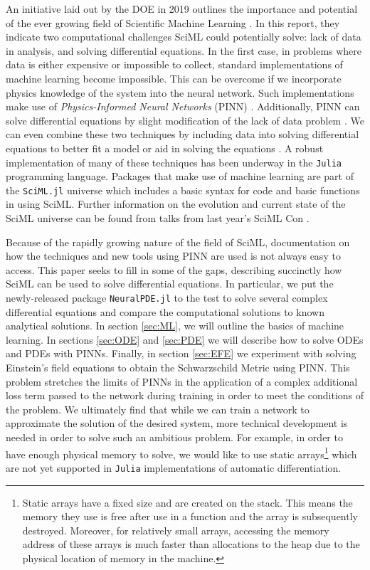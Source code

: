 \documentclass{CUP-JNL-DTM}%
\theoremstyle{definition}
\numberwithin{equation}{section}
\newcommand{\Julia}{\texttt{Julia} }
\begin{document}
An initiative laid out by the DOE in 2019 outlines the importance and potential of the ever growing field of Scientific Machine Learning \cite{bakerWorkshopReportBasic2019}. In this report, they indicate two computational challenges SciML could potentially solve: lack of data in analysis, and solving differential equations. In the first case, in problems where data is either expensive or impossible to collect, standard implementations of machine learning become impossible. This can be overcome if we incorporate physics knowledge of the system into the neural network. Such implementations make use of \emph{Physics-Informed Neural Networks} (PINN) \cite{karniadakisPhysicsinformedMachineLearning2021}. Additionally, PINN can solve differential equations by slight modification of the lack of data problem \cite{lagarisArtificialNeuralNetworks1997,hanSolvingHighdimensionalPartial2018,blechschmidtThreeWaysSolve2021}. We can even combine these two techniques by including data into solving differential equations to better fit a model or aid in solving the equations \cite{raissiPhysicsinformedNeuralNetworks2019}. A robust implementation of many of these techniques has been underway in the \Julia programming language. Packages that make use of machine learning are part of the \texttt{SciML.jl} universe which includes a basic syntax for code and basic functions in using SciML. Further information on the evolution and current state of the SciML universe can be found from talks from last year's SciML Con \cite{SciMLCon2022}. 

Because of the rapidly growing nature of the field of SciML, documentation on how the techniques and new tools using PINN are used is not always easy to access. This paper seeks to fill in some of the gaps, describing succinctly how SciML can be used to solve differential equations. In particular, we put the newly-released package \texttt{NeuralPDE.jl} to the test to solve several complex differential equations and compare the computational solutions to known analytical solutions. In section \ref{sec:ML}, we will outline the basics of machine learning. In sections \ref{sec:ODE} and \ref{sec:PDE} we will describe how to solve ODEs and PDEs with PINNs. Finally, in section \ref{sec:EFE} we experiment with solving Einstein's field equations to obtain the Schwarzschild Metric using PINN. This problem stretches the limits of PINNs in the application of a complex additional loss term passed to the network during training in order to meet the conditions of the problem. We ultimately find that while we can train a network to approximate the solution of the desired system, more technical development is needed in order to solve such an ambitious problem. For example, in order to have enough physical memory to solve, we would like to use static arrays\footnote{Static arrays have a fixed size and are created on the stack. This means the memory they use is free after use in a function and the array is subsequently destroyed. Moreover, for relatively small arrays, accessing the memory address of these arrays is much faster than allocations to the heap due to the physical location of memory in the machine.} which are not yet supported in \Julia implementations of automatic differentiation.   
\end{document}
